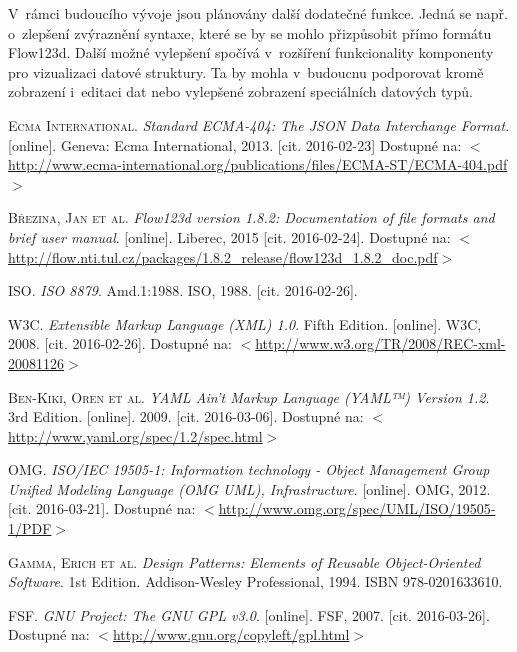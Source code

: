 \documentclass[FM,bw,DP]{tulthesis}
\begin{document}
V~rámci budoucího vývoje jsou plánovány další dodatečné funkce. Jedná se např. o~zlepšení zvýraznění syntaxe, které se by se mohlo přizpůsobit přímo formátu Flow123d. Další možné vylepšení spočívá v~rozšíření funkcionality komponenty pro vizualizaci datové struktury. Ta by mohla v~budoucnu podporovat kromě zobrazení i~editaci dat nebo vylepšené zobrazení speciálních datových typů.

\begin{thebibliography}{99}


\textsc{Ecma International.} \textit{Standard ECMA-404: The JSON Data Interchange Format.} [online]. Geneva: Ecma International, 2013. [cit. 2016-02-23] Dostupné na: $<$\url{http://www.ecma-international.org/publications/files/ECMA-ST/ECMA-404.pdf}$>$

\textsc{Březina, Jan et al.} \textit{Flow123d version 1.8.2: Documentation of file formats and brief user manual}. [online]. Liberec, 2015 [cit. 2016-02-24]. Dostupné na: $<$\url{http://flow.nti.tul.cz/packages/1.8.2_release/flow123d_1.8.2_doc.pdf}$>$

\textsc{\acrshort{ISO}.} \textit{ISO 8879}. Amd.1:1988. \acrfull{ISO}, 1988. [cit. 2016-02-26]. 

\textsc{\acrshort{W3C}.} \textit{Extensible Markup Language (XML) 1.0}. Fifth Edition. [online]. \acrfull{W3C}, 2008. [cit. 2016-02-26]. Dostupné na: $<$\url{http://www.w3.org/TR/2008/REC-xml-20081126}$>$

\textsc{Ben-Kiki, Oren et al.} \textit{YAML Ain’t Markup Language (YAML™) Version 1.2}. 3rd Edition. [online]. 2009. [cit. 2016-03-06]. Dostupné na: $<$\url{http://www.yaml.org/spec/1.2/spec.html}$>$

\textsc{\acrshort{OMG}.} \textit{ISO/IEC 19505-1: Information technology - Object Management Group
Unified Modeling Language (OMG UML),
Infrastructure}. [online]. \acrfull{OMG}, 2012. [cit. 2016-03-21]. Dostupné na: $<$\url{http://www.omg.org/spec/UML/ISO/19505-1/PDF}$>$

\textsc{Gamma, Erich et al.} \textit{Design Patterns: Elements of Reusable Object-Oriented Software}. 1st Edition. Addison-Wesley Professional, 1994. ISBN 978-0201633610.

\acrshort{FSF}. \textit{\acrshort{GNU} Project: The \acrshort{GNU} \acrlong{GPL} v3.0}. [online]. \acrfull{FSF}, 2007. [cit. 2016-03-26]. Dostupné na: $<$\url{http://www.gnu.org/copyleft/gpl.html}$>$


\end{thebibliography}
\end{document}
